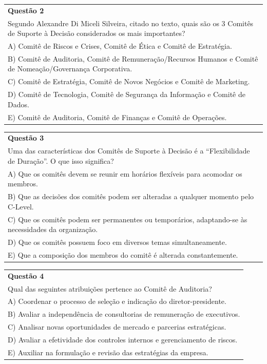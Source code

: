 \documentclass[
]{book}
\begin{document}
\begin{longtable}[]{@{}
  >{\raggedright\arraybackslash}p{}@{}}
\toprule\noalign{}
\endhead
\bottomrule\noalign{}
\endlastfoot
\textbf{Questão 2} \\
Segundo Alexandre Di Miceli Silveira, citado no texto, quais são os 3 Comitês de Suporte à Decisão considerados os mais importantes? \\
A) Comitê de Riscos e Crises, Comitê de Ética e Comitê de Estratégia. \\
B) Comitê de Auditoria, Comitê de Remuneração/Recursos Humanos e Comitê de Nomeação/Governança Corporativa. \\
C) Comitê de Estratégia, Comitê de Novos Negócios e Comitê de Marketing. \\
D) Comitê de Tecnologia, Comitê de Segurança da Informação e Comitê de Dados. \\
E) Comitê de Auditoria, Comitê de Finanças e Comitê de Operações. \\
\end{longtable}

\begin{longtable}[]{@{}
  >{\raggedright\arraybackslash}p{}@{}}
\toprule\noalign{}
\endhead
\bottomrule\noalign{}
\endlastfoot
\textbf{Questão 3} \\
Uma das características dos Comitês de Suporte à Decisão é a ``Flexibilidade de Duração''. O que isso significa? \\
A) Que os comitês devem se reunir em horários flexíveis para acomodar os membros. \\
B) Que as decisões dos comitês podem ser alteradas a qualquer momento pelo C-Level. \\
C) Que os comitês podem ser permanentes ou temporários, adaptando-se às necessidades da organização. \\
D) Que os comitês possuem foco em diversos temas simultaneamente. \\
E) Que a composição dos membros do comitê é alterada constantemente. \\
\end{longtable}

\begin{longtable}[]{@{}
  >{\raggedright\arraybackslash}p{}@{}}
\toprule\noalign{}
\endhead
\bottomrule\noalign{}
\endlastfoot
\textbf{Questão 4} \\
Qual das seguintes atribuições pertence ao Comitê de Auditoria? \\
A) Coordenar o processo de seleção e indicação do diretor-presidente. \\
B) Avaliar a independência de consultorias de remuneração de executivos. \\
C) Analisar novas oportunidades de mercado e parcerias estratégicas. \\
D) Avaliar a efetividade dos controles internos e gerenciamento de riscos. \\
E) Auxiliar na formulação e revisão das estratégias da empresa. \\
\end{longtable}
\end{document}
